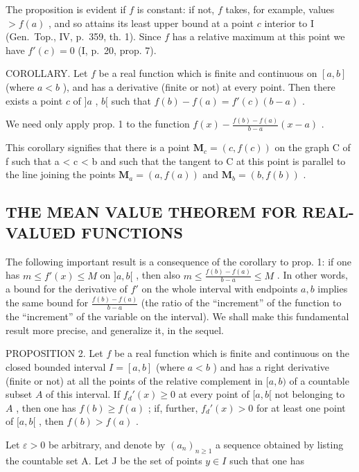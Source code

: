 The proposition is evident if \(f\) is constant: if not, \(f\) takes, for example, values \(> f(a)\) , and so attains its least upper bound at a point \(c\) interior to I (Gen.~Top., IV, p.~359, th. 1). Since \(f\) has a relative maximum at this point we have \(f'(c) = 0\) (I, p.~20, prop. 7).

COROLLARY. Let \(f\) be a real function which is finite and continuous on \([a, b]\) (where \(a < b\) ), and has a derivative (finite or not) at every point. Then there exists a point \(c\) of \(]a\) , \(b[\) such that \(f(b) - f(a) = f'(c)(b - a)\) .

We need only apply prop. 1 to the function \(f(x) - \frac{f(b) - f(a)}{b - a} (x - a)\) .

This corollary signifies that there is a point \(\mathbf{M}_{c} = (c, f(c))\) on the graph C of f such that a \textless{} c \textless{} b and such that the tangent to C at this point is parallel to the line joining the points \(\mathbf{M}_{a} = (a, f(a))\) and \(\mathbf{M}_{b} = (b, f(b))\) .

\subsection{THE MEAN VALUE THEOREM FOR REAL-VALUED FUNCTIONS}

The following important result is a consequence of the corollary to prop. 1: if one has \(m \leqslant f'(x) \leqslant M\) on \(]a, b[\) , then also \(m \leqslant \frac{f(b) - f(a)}{b - a} \leqslant M\) . In other words, a bound for the derivative of \(f'\) on the whole interval with endpoints \(a, b\) implies the same bound for \(\frac{f(b) - f(a)}{b - a}\) (the ratio of the ``increment'' of the function to the ``increment'' of the variable on the interval). We shall make this fundamental result more precise, and generalize it, in the sequel.

PROPOSITION 2. Let \(f\) be a real function which is finite and continuous on the closed bounded interval \(I = [a, b]\) (where \(a < b\) ) and has a right derivative (finite or not) at all the points of the relative complement in \([a, b)\) of a countable subset \(A\) of this interval. If \(f_d'(x) \geqslant 0\) at every point of \([a, b[\) not belonging to \(A\) , then one has \(f(b) \geqslant f(a)\) ; if, further, \(f_d'(x) > 0\) for at least one point of \([a, b[\) , then \(f(b) > f(a)\) .

Let \(\varepsilon > 0\) be arbitrary, and denote by \((a_n)_{n \geqslant 1}\) a sequence obtained by listing the countable set A. Let J be the set of points \(y \in I\) such that one has

